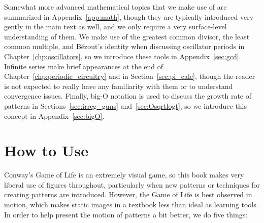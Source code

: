 Somewhat more advanced mathematical topics that we make use of are summarized in Appendix~\ref{app:math}, though they are typically introduced very gently in the main text as well, and we only require a very surface-level understanding of them. We make use of the greatest common divisor, the least common multiple, and B\'ezout's identity when discussing oscillator periods in Chapter~\ref{chp:oscillators}, so we introduce these tools in Appendix~\ref{sec:gcd}. Infinite series make brief appearances at the end of Chapter~\ref{chp:periodic_circuitry} and in Section~\ref{sec:pi_calc}, though the reader is not expected to really have any familiarity with them or to understand convergence issues. Finally, big-O notation is used to discuss the growth rate of patterns in Sections~\ref{sec:irreg_guns} and~\ref{sec:Osqrtlogt}, so we introduce this concept in Appendix~\ref{sec:bigO}.


\section*{How to Use}

Conway's Game of Life is an extremely visual game, so this book makes very liberal use of figures throughout, particularly when new patterns or techniques for creating patterns are introduced. However, the Game of Life is best observed in motion, which makes static images in a textbook less than ideal as learning tools. In order to help present the motion of patterns a bit better, we do five things:\medskip

